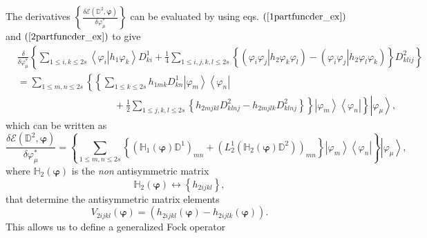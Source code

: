 \documentclass[aps,preprint]{revtex4}%
\begin{document}
The derivatives $\left\{  \frac{\delta\mathcal{E}\left(  \mathbb{D}%
^{2},\mathbf{\varphi}\right)  }{\delta\varphi_{\mu}^{\ast}}\right\}  $ can be
evaluated by using eqs. $\left(  \ref{1partfuncder_ex}\right)  $ and $\left(
\ref{2partfuncder_ex}\right)  $ to give
\begin{align}
&  \frac{\delta}{\delta\varphi_{\mu}^{\ast}}\left\{  \sum_{1\leq i,k\leq
2s}\left\langle \left.  \varphi_{i}\right\vert h_{1}\varphi_{k}\right\rangle
D_{ki}^{1}+\frac{1}{4}\sum_{1\leq i,j,k,l\leq2s}\left\{  \left(  \left.
\varphi_{i}\varphi_{j}\right\vert h_{2}\varphi_{k}\varphi_{l}\right)  -\left(
\left.  \varphi_{i}\varphi_{j}\right\vert h_{2}\varphi_{l}\varphi_{k}\right)
\right\}  D_{klij}^{2}\right\}  \nonumber\\
&  =\sum_{1\leq m,n\leq2s}\left\{  \left\{  \sum_{1\leq k\leq2s}h_{1mk}%
D_{kn}^{1}\left\vert \varphi_{m}\right\rangle \left\langle \varphi
_{n}\right\vert \right.  \right.  \nonumber\\
&  \qquad\qquad\qquad\qquad\qquad+\left.  \left.  \frac{1}{2}\sum_{1\leq
j,k,l\leq2s}\left\{  h_{2mjkl}D_{klnj}^{2}-h_{2mjlk}D_{klnj}^{2}\right\}
\right\}  \left\vert \varphi_{m}\right\rangle \left\langle \varphi
_{n}\right\vert \right\}  \left\vert \varphi_{\mu}\right\rangle ,
\end{align}
which can be written as
\begin{equation}
\frac{\delta\mathcal{E}\left(  \mathbb{D}^{2},\mathbf{\varphi}\right)
}{\delta\varphi_{\mu}^{\ast}}=\left\{  \sum_{1\leq m,n\leq2s}\left\{  \left(
\mathbb{H}_{1}\left(  \mathbf{\varphi}\right)  \mathbb{D}^{1}\right)
_{mn}+\left(  L_{2}^{1}\left(  \mathbb{H}_{2}\left(  \mathbf{\varphi}\right)
\mathbb{D}^{2}\right)  \right)  _{mn}\right\}  \left\vert \varphi
_{m}\right\rangle \left\langle \varphi_{n}\right\vert \right\}  \left\vert
\varphi_{\mu}\right\rangle ,
\end{equation}
where $\mathbb{H}_{2}\left(  \mathbf{\varphi}\right)  $ is the \emph{non
}antisymmetric matrix
\begin{equation}
\mathbb{H}_{2}\left(  \mathbf{\varphi}\right)  \leftrightarrow\left\{
h_{2ijkl}\right\}  ,
\end{equation}
that determine the antisymmetric matrix elements
\begin{equation}
V_{2ijkl}\left(  \mathbf{\varphi}\right)  =\left(  h_{2ijkl}\left(
\mathbf{\varphi}\right)  -h_{2ijlk}\left(  \mathbf{\varphi}\right)  \right)  .
\end{equation}
This allows us to define a generalized Fock operator
\end{document}
